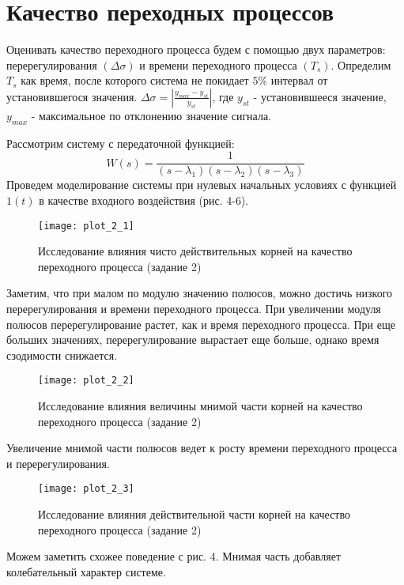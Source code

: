 \section{Качество переходных процессов}
Оценивать качество переходного процесса будем с помощью двух параметров: перерегулирования $(\Delta \sigma)$
и времени переходного процесса $(T_s)$. Определим $T_s$ как время, после которого система не покидает $5\%$ интервал
от установившегося значения. $\Delta \sigma = |\frac{y_{max} - y_{st}}{y_{st}}|$, где 
$y_{st}$ - установившееся значение, $y_{max}$ - максимальное по отклонению значение сигнала.

Рассмотрим систему с передаточной функцией:
\begin{equation}
    W(s) = \frac{1}{(s-\lambda_1)(s-\lambda_2)(s-\lambda_3)}
\end{equation}
Проведем моделирование системы при нулевых начальных условиях с функцией $1(t)$ в качестве входного воздействия (рис. 4-6).

\begin{figure}[h]
    \centering
    \texttt{[image: plot\_2\_1]}
    \caption{\label{fig:The-caption-1} Исследование влияния чисто действительных корней на качество переходного процесса (задание 2)}
\end{figure}
Заметим, что при малом по модулю значению полюсов, можно достичь низкого перерегулирования и времени переходного процесса. При 
увеличении модуля полюсов перерегулирование растет, как и время переходного процесса. 
При еще больших значениях, перерегулирование вырастает еще больше, однако время сзодимости снижается.
\pagebreak
\begin{figure}[h]
    \centering
    \texttt{[image: plot\_2\_2]}
    \caption{\label{fig:The-caption-1} Исследование влияния величины мнимой части корней на качество переходного процесса (задание 2)}
\end{figure}

Увеличение мнимой части полюсов ведет к росту времени переходного процесса и перерегулирования.
\pagebreak
\begin{figure}[h]
    \centering
    \texttt{[image: plot\_2\_3]}
    \caption{\label{fig:The-caption-1} Исследование влияния действительной части корней на качество переходного процесса (задание 2)}
\end{figure}

Можем заметить схожее поведение с рис. 4. Мнимая часть добавляет колебательный характер системе.
\pagebreak

